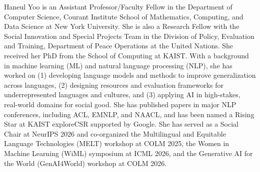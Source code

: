 Haneul Yoo is an Assistant Professor/Faculty Fellow in the Department of Computer Science, Courant Institute School of Mathematics, Computing, and Data Science at New York University. She is also a Research Fellow with the Social Innovation and Special Projects Team in the Division of Policy, Evaluation and Training, Department of Peace Operations at the United Nations. She received her PhD from the School of Computing at KAIST. With a background in machine learning (ML) and natural language processing (NLP), she has worked on (1) developing language models and methods to improve generalization across languages, (2) designing resources and evaluation frameworks for underrepresented languages and cultures, and (3) applying AI in high-stakes, real-world domains for social good. She has published papers in major NLP conferences, including ACL, EMNLP, and NAACL, and has been named a Rising Star at KAIST exploreCSR supported by Google. She has served as a Social Chair at NeurIPS 2026 and co-organized the Multilingual and Equitable Language Technologies (MELT) workshop at COLM 2025, the Women in Machine Learning (WiML) symposium at ICML 2026, and the Generative AI for the World (GenAI4World) workshop at COLM 2026.